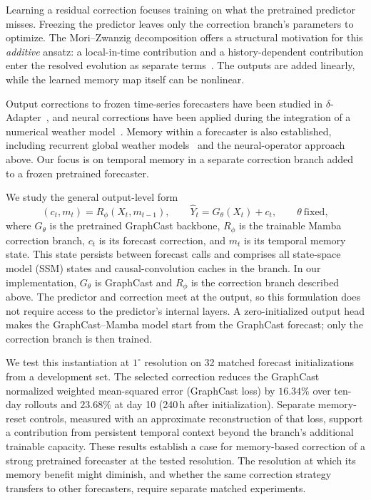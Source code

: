 Learning a residual correction focuses training on what the pretrained predictor misses. Freezing the predictor leaves only the correction branch's parameters to optimize. The Mori--Zwanzig decomposition offers a structural motivation for this \emph{additive} ansatz: a local-in-time contribution and a history-dependent contribution enter the resolved evolution as separate terms~\cite{YenTingLinMZ2021,de2026data}. The outputs are added linearly, while the learned memory map itself can be nonlinear.

Output corrections to frozen time-series forecasters have been studied in $\delta$-Adapter~\cite{liang2026forecast}, and neural corrections have been applied during the integration of a numerical weather model~\cite{chen2022correcting}. Memory within a forecaster is also established, including recurrent global weather models~\cite{hu2023swinvrnn} and the neural-operator approach above. Our focus is on temporal memory in a separate correction branch added to a frozen pretrained forecaster.

We study the general output-level form
\begin{equation}
    (c_t,m_t)=R_\phi(X_t,m_{t-1}),
    \qquad
    \widehat{Y}_t=G_\theta(X_t)+c_t,
    \qquad \theta\ \text{fixed},
    \label{eq:intro_memory_correction}
\end{equation}
where $G_\theta$ is the pretrained GraphCast backbone, $R_\phi$ is the trainable Mamba correction branch, $c_t$ is its forecast correction, and $m_t$ is its temporal memory state. This state persists between forecast calls and comprises all state-space model (SSM) states and causal-convolution caches in the branch. In our implementation, $G_\theta$ is GraphCast and $R_\phi$ is the correction branch described above. The predictor and correction meet at the output, so this formulation does not require access to the predictor's internal layers. A zero-initialized output head makes the GraphCast--Mamba model start from the GraphCast forecast; only the correction branch is then trained.

We test this instantiation at $1^\circ$ resolution on 32 matched forecast initializations from a development set. The selected correction reduces the GraphCast normalized weighted mean-squared error (GraphCast loss) by $16.34\%$ over ten-day rollouts and $23.68\%$ at day 10 (240\,h after initialization). Separate memory-reset controls, measured with an approximate reconstruction of that loss, support a contribution from persistent temporal context beyond the branch's additional trainable capacity. These results establish a case for memory-based correction of a strong pretrained forecaster at the tested resolution. The resolution at which its memory benefit might diminish, and whether the same correction strategy transfers to other forecasters, require separate matched experiments.
